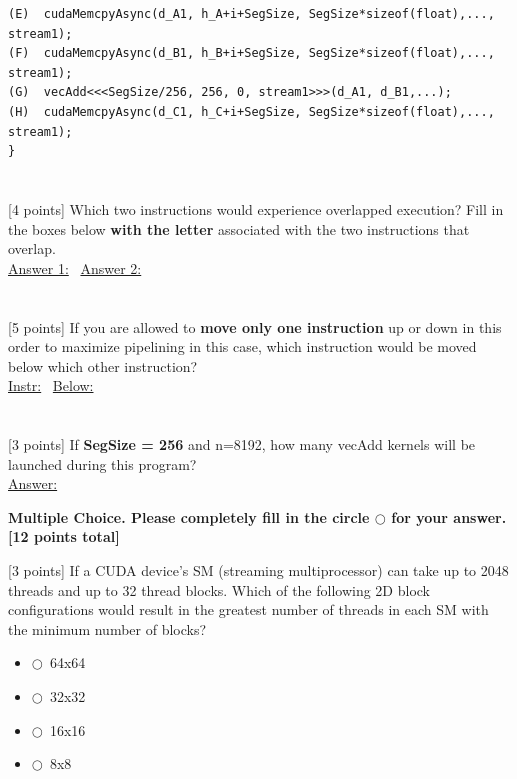 \documentclass[12pt]{exam}
\newcommand{\Ans}{\underline{Answer:}\ }
\newcommand{\smallbox}{\framebox[5cm]{\rule{0pt}{1.1cm}}}
\newcommand{\mc}{$\bigcirc$\ }   %
\begin{document}
\begin{questions}
\begin{Verbatim}[xleftmargin=1em]
(E)  cudaMemcpyAsync(d_A1, h_A+i+SegSize, SegSize*sizeof(float),..., stream1);
(F)  cudaMemcpyAsync(d_B1, h_B+i+SegSize, SegSize*sizeof(float),..., stream1);
(G)  vecAdd<<<SegSize/256, 256, 0, stream1>>>(d_A1, d_B1,...);
(H)  cudaMemcpyAsync(d_C1, h_C+i+SegSize, SegSize*sizeof(float),..., stream1);
}
\end{Verbatim}

\begin{parts}
  \part {}[4 points] Which two instructions would experience overlapped execution? Fill in the
        boxes below \textbf{with the letter} associated with the two instructions that overlap.\\[10pt]
        \underline{Answer 1:}\ \framebox[4cm]{\rule{0pt}{1.1cm}}\hfill
        \underline{Answer 2:}\ \framebox[4cm]{\rule{0pt}{1.1cm}}
  \part {}[5 points] If you are allowed to \textbf{move only one instruction} up or down in this
        order to maximize pipelining in this case, which instruction would be moved below which
        other instruction?\\[10pt]
        \underline{Instr:}\ \framebox[4cm]{\rule{0pt}{1.1cm}}\hfill
        \underline{Below:}\ \framebox[4cm]{\rule{0pt}{1.1cm}}
  \part {}[3 points] If \textbf{SegSize = 256} and n=8192, how many vecAdd kernels will be
        launched during this program?\\[10pt]
        \Ans \smallbox
\end{parts}

\newpage
\textbf{Multiple Choice. \textnormal{Please completely fill in the circle} $\bigcirc$
\textnormal{for your answer.} [12 points total]}

\vspace{6pt}
\question {}[3 points] If a CUDA device's SM (streaming multiprocessor) can take up to 2048
threads and up to 32 thread blocks. Which of the following 2D block configurations would
result in the greatest number of threads in each SM with the minimum number of blocks?
\begin{itemize}[leftmargin=2.5em,itemsep=4pt,label={}]
  \item \mc 64x64
  \item \mc 32x32
  \item \mc 16x16
  \item \mc 8x8
\end{itemize}


\end{questions}
\end{document}
